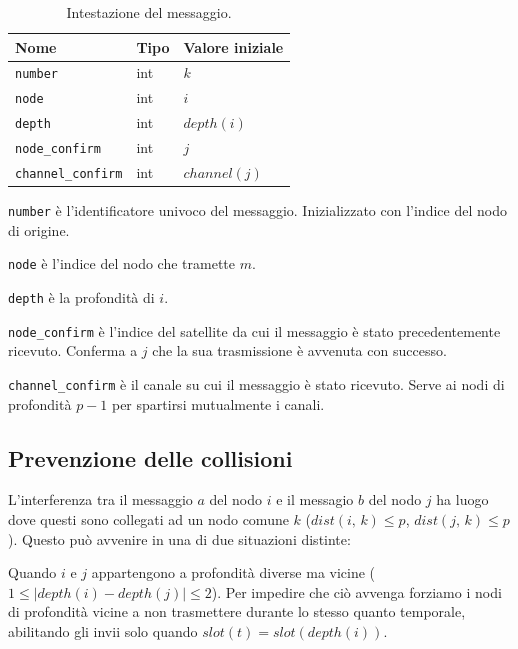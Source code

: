 \documentclass[a4paper,11pt]{article}
\theoremstyle{definition}
\begin{document}
\begin{table}[H]
\centering
\begin{tabular}{| l | l | l |}
\multicolumn{1}{l}{Nome} &
\multicolumn{1}{l}{Tipo} &
\multicolumn{1}{l}{Valore iniziale} \\ \hline
\texttt{number} & int & $k$ \\ \hline
\texttt{node} & int & $i$ \\ \hline
\texttt{depth} & int & $depth(i)$ \\ \hline
\texttt{node\_confirm} & int & $j$ \\ \hline
\texttt{channel\_confirm} & int & $channel(j)$ \\ \hline
\end{tabular}
\caption{Intestazione del messaggio.}
\end{table}

\texttt{number} è l'identificatore univoco del messaggio. Inizializzato con l'indice del nodo di origine.

\texttt{node} è l'indice del nodo che tramette $m$.

\texttt{depth} è la profondità di $i$.

\texttt{node\_confirm} è l'indice del satellite da cui il messaggio è stato precedentemente ricevuto. Conferma a $j$ che la sua trasmissione è avvenuta con successo.

\texttt{channel\_confirm} è il canale su cui il messaggio è stato ricevuto. Serve ai nodi di profondità $p-1$ per spartirsi mutualmente i canali.

\subsection{Prevenzione delle collisioni}

L'interferenza tra il messaggio $a$ del nodo $i$ e il messagio $b$ del nodo $j$ ha luogo dove questi sono collegati ad un nodo comune $k$ ($dist(i,\,k) \leq p$, $dist(j,\,k) \leq p$). Questo può avvenire in una di due situazioni distinte:

Quando $i$ e $j$ appartengono a profondità diverse ma vicine ($1 \leq |depth(i) - depth(j)| \leq 2$). Per impedire che ciò avvenga forziamo i nodi di profondità vicine a non trasmettere durante lo stesso quanto temporale, abilitando gli invii solo quando $slot(t) = slot(depth(i))$.
\end{document}
